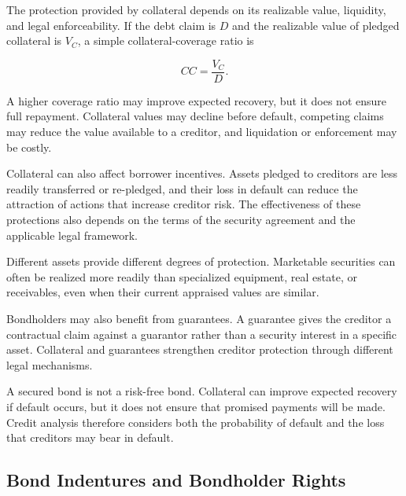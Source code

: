 The protection provided by collateral depends on its realizable value, liquidity, and legal enforceability. If the debt claim is $D$ and the realizable value of pledged collateral is $V_C$, a simple collateral-coverage ratio is

\begin{equation}
CC=\frac{V_C}{D}.
\label{eq:ch8-collateral-coverage}
\end{equation}

A higher coverage ratio may improve expected recovery, but it does not ensure full repayment. Collateral values may decline before default, competing claims may reduce the value available to a creditor, and liquidation or enforcement may be costly.

Collateral can also affect borrower incentives. Assets pledged to creditors are less readily transferred or re-pledged, and their loss in default can reduce the attraction of actions that increase creditor risk. The effectiveness of these protections also depends on the terms of the security agreement and the applicable legal framework.

Different assets provide different degrees of protection. Marketable securities can often be realized more readily than specialized equipment, real estate, or receivables, even when their current appraised values are similar.

Bondholders may also benefit from guarantees. A guarantee gives the creditor a contractual claim against a guarantor rather than a security interest in a specific asset. Collateral and guarantees strengthen creditor protection through different legal mechanisms.

\begin{tcolorbox}[
  enhanced,
  breakable,
  colback=white,
  colframe=FinanceBlue,
  boxrule=0.7pt,
  sharp corners,
  borderline west={2.2pt}{0pt}{FinanceBlue},
  title=\textbf{Financial Perspective: A Secured Bond Is Not Risk Free},
  coltitle=white,
  colbacktitle=FinanceBlue,
  fonttitle=\bfseries,
  before skip=1.2em,
  after skip=1.2em
]

A secured bond is not a risk-free bond. Collateral can improve expected recovery if default occurs, but it does not ensure that promised payments will be made. Credit analysis therefore considers both the probability of default and the loss that creditors may bear in default.

\end{tcolorbox}

\subsection{Bond Indentures and Bondholder Rights}

